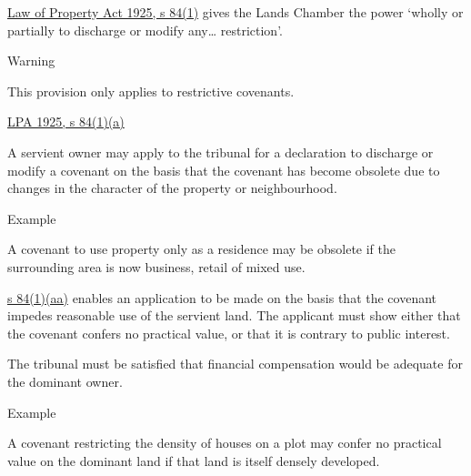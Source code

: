 \documentclass[
]{article}
\newenvironment{env-b1feafbb-b990-4f84-956e-67a6473913ab}
{
    \savenotes\tcolorbox[blanker,breakable,left=5pt,borderline west={2pt}{-4pt}{green}]
}
{
    \endtcolorbox\spewnotes
}
\newenvironment{env-6551cd31-4c34-4de5-9b70-48dd453ea5fd}
{
    \savenotes\tcolorbox[blanker,breakable,left=5pt,borderline west={2pt}{-4pt}{orange}]
}
{
    \endtcolorbox\spewnotes
}
\newenvironment{env-c75278ec-0f81-4db3-97b1-0452147ba646}
{
    \savenotes\tcolorbox[blanker,breakable,left=5pt,borderline west={2pt}{-4pt}{purple}]
}
{
    \endtcolorbox\spewnotes
}
\begin{document}
\href{https://www.legislation.gov.uk/ukpga/Geo5/15-16/20/section/84}{Law
of Property Act 1925, s 84(1)} gives the Lands Chamber the power `wholly
or partially to discharge or modify any\ldots{} restriction'.

\begin{env-6551cd31-4c34-4de5-9b70-48dd453ea5fd}

Warning

This provision only applies to restrictive covenants.

\end{env-6551cd31-4c34-4de5-9b70-48dd453ea5fd}

\begin{env-b1feafbb-b990-4f84-956e-67a6473913ab}

\href{https://www.legislation.gov.uk/ukpga/Geo5/15-16/20/section/84}{LPA
1925, s 84(1)(a)}

A servient owner may apply to the tribunal for a declaration to
discharge or modify a covenant on the basis that the covenant has become
obsolete due to changes in the character of the property or
neighbourhood.

\end{env-b1feafbb-b990-4f84-956e-67a6473913ab}

\begin{env-c75278ec-0f81-4db3-97b1-0452147ba646}

Example

A covenant to use property only as a residence may be obsolete if the
surrounding area is now business, retail of mixed use.

\end{env-c75278ec-0f81-4db3-97b1-0452147ba646}

\href{https://www.legislation.gov.uk/ukpga/Geo5/15-16/20/section/84}{s
84(1)(aa)} enables an application to be made on the basis that the
covenant impedes reasonable use of the servient land. The applicant must
show either that the covenant confers no practical value, or that it is
contrary to public interest.

The tribunal must be satisfied that financial compensation would be
adequate for the dominant owner.

\begin{env-c75278ec-0f81-4db3-97b1-0452147ba646}

Example

A covenant restricting the density of houses on a plot may confer no
practical value on the dominant land if that land is itself densely
developed.

\end{env-c75278ec-0f81-4db3-97b1-0452147ba646}
\end{document}
